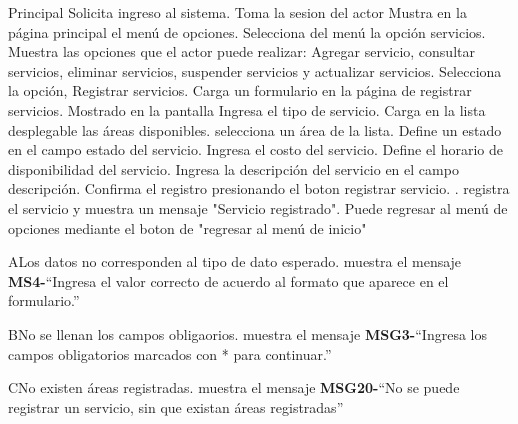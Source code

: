 	\begin{UCtrayectoria}{Principal}
		\UCpaso[\UCactor] Solicita ingreso al sistema.
		\UCpaso Toma la sesion del actor
		\UCpaso Mustra en la página principal el menú de opciones.
		\UCpaso[\UCactor] Selecciona del menú la opción servicios.
		\UCpaso Muestra las opciones que el actor puede realizar: Agregar servicio, consultar servicios, eliminar servicios, suspender servicios y actualizar servicios.
		\UCpaso[\UCactor] Selecciona la opción, Registrar servicios. 
		\UCpaso Carga un formulario en la página de registrar servicios. Mostrado en la pantalla 
		\UCpaso[\UCactor] Ingresa el tipo de servicio.
		\UCpaso Carga en la lista desplegable las áreas disponibles. 
		\UCpaso[\UCactor] selecciona un área de la lista.
		\UCpaso[\UCactor] Define un estado en el campo estado del servicio.
		\UCpaso[\UCactor] Ingresa el costo del servicio.
		\UCpaso[\UCactor] Define el horario de disponibilidad del servicio.
		\UCpaso[\UCactor] Ingresa la descripción del servicio en el campo descripción.
		\UCpaso[\UCactor] Confirma el registro presionando el boton registrar servicio.  .
		\UCpaso registra el servicio y muestra un mensaje "Servicio registrado".
		\UCpaso[\UCactor] Puede regresar al menú de opciones mediante el boton de "regresar al menú de inicio"

	\end{UCtrayectoria}

		\begin{UCtrayectoriaA}{A}{Los datos no corresponden al tipo de dato esperado.}
		\UCpaso muestra el mensaje {\bf MS4-}``Ingresa el valor correcto de acuerdo al formato que aparece en el formulario.''
		\end{UCtrayectoriaA}

		\begin{UCtrayectoriaA}{B}{No se llenan los campos obligaorios.}
			\UCpaso muestra el mensaje {\bf MSG3-}``Ingresa los campos obligatorios marcados con * para continuar.''
		\end{UCtrayectoriaA}

		\begin{UCtrayectoriaA}{C}{No existen áreas registradas.}
			\UCpaso muestra el mensaje {\bf MSG20-}``No se puede registrar un servicio, sin que existan áreas registradas''
		\end{UCtrayectoriaA}
	
